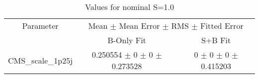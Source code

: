 \begin{table}
\centering
\caption{Values for nominal S=1.0}
\begin{tabular}{ccc}
\toprule
Parameter & \multicolumn{2}{c}{Mean $\pm$ Mean Error $\pm$ RMS $\pm$ Fitted Error}\\
 & B-Only Fit & S+B Fit\\
\midrule
CMS\_scale\_1p25j & \num{0.250554} $\pm$ \num{0} $\pm$ \num{0} $\pm$ \num{0.273528} & \num{0} $\pm$ \num{0} $\pm$ \num{0} $\pm$ \num{0.415203}\\
\bottomrule
\end{tabular}
\end{table}